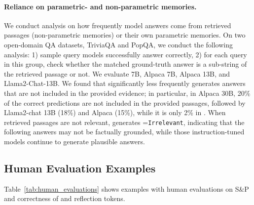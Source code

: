 \paragraph{Reliance on parametric- and non-parametric memories.}
We conduct analysis on how frequently model answers come from retrieved passages (non-parametric memories) or their own parametric memories. 
On two open-domain QA datasets, TriviaQA and PopQA, we conduct the following analysis: 1) sample query models successfully answer correctly, 2) for each query in this group, check whether the matched ground-truth answer is a sub-string of the retrieved passage or not. We evaluate \model 7B, Alpaca 7B, Alpaca 13B, and Llama2-Chat-13B. 
We found that \model significantly less frequently generates answers that are not included in the provided evidence; in particular, in Alpaca 30B, 20\% of the correct predictions are not included in the provided passages, followed by Llama2-chat 13B (18\%) and Alpaca (15\%), while it is only 2\% in \model. When retrieved passages are not relevant, \model generates \crel=\texttt{Irrelevant}, indicating that the following answers may not be factually grounded, while those instruction-tuned models continue to generate plausible answers. 

\subsection{Human Evaluation Examples}
Table~\ref{tab:human_evaluations} shows examples with human evaluations on S\&P and correctness of \crel and \cgr reflection tokens. 

